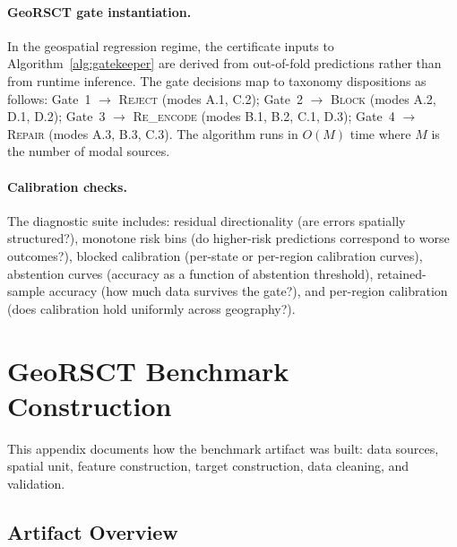 \documentclass{article}
\begin{document}
\paragraph{GeoRSCT gate instantiation.} In the geospatial regression regime, the certificate inputs to Algorithm~\ref{alg:gatekeeper} are derived from out-of-fold predictions rather than from runtime inference. The gate decisions map to taxonomy dispositions as follows: Gate~1 $\to$ \textsc{Reject} (modes A.1, C.2); Gate~2 $\to$ \textsc{Block} (modes A.2, D.1, D.2); Gate~3 $\to$ \textsc{Re\_encode} (modes B.1, B.2, C.1, D.3); Gate~4 $\to$ \textsc{Repair} (modes A.3, B.3, C.3). The algorithm runs in $O(M)$ time where $M$ is the number of modal sources.

\paragraph{Calibration checks.} The diagnostic suite includes: residual directionality (are errors spatially structured?), monotone risk bins (do higher-risk predictions correspond to worse outcomes?), blocked calibration (per-state or per-region calibration curves), abstention curves (accuracy as a function of abstention threshold), retained-sample accuracy (how much data survives the gate?), and per-region calibration (does calibration hold uniformly across geography?).

\section{GeoRSCT Benchmark Construction}
\label{app:benchmark_construction}

This appendix documents how the benchmark artifact was built: data sources, spatial unit, feature construction, target construction, data cleaning, and validation.

\subsection{Artifact Overview}
\end{document}
